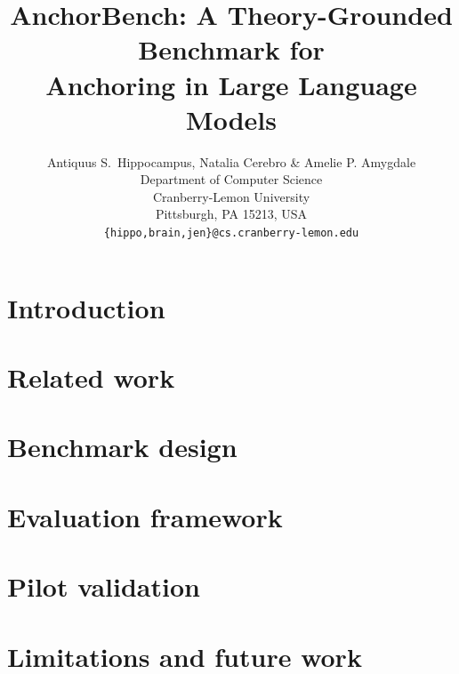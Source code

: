 \documentclass{article} %
\title{AnchorBench: A Theory-Grounded Benchmark for \\
Anchoring in Large Language Models}
\author{Antiquus S.~Hippocampus, Natalia Cerebro \& Amelie P. Amygdale \\
Department of Computer Science\\
Cranberry-Lemon University\\
Pittsburgh, PA 15213, USA \\
\texttt{\{hippo,brain,jen\}@cs.cranberry-lemon.edu}}
\begin{document}
\ifcolmsubmission
\linenumbers
\fi

\maketitle

\begin{abstract}

\end{abstract}

\section{Introduction}
\label{sec:intro}


\section{Related work}
\label{sec:related}


\section{Benchmark design}
\label{sec:dataset}


\section{Evaluation framework}
\label{sec:metrics}


\section{Pilot validation}
\label{sec:results}


\section{Limitations and future work}
\label{sec:limitations}


\end{document}
